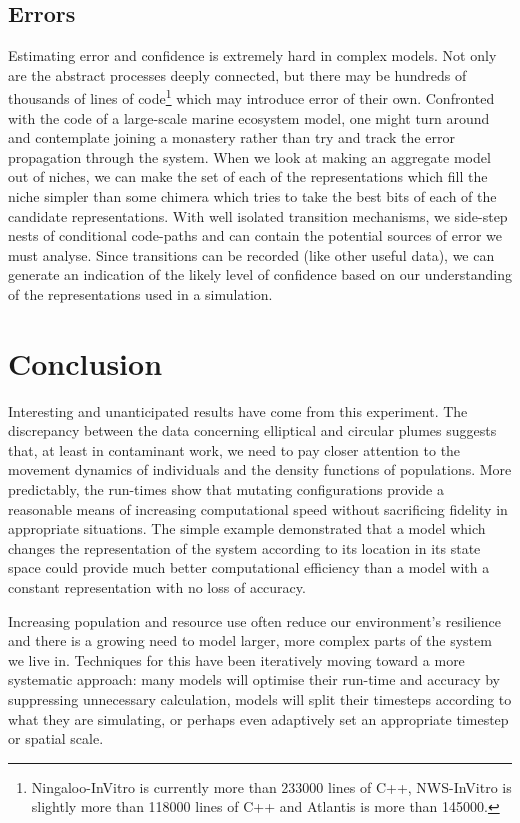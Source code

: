 \subsection{Errors}

Estimating error and confidence is extremely hard in complex models. Not only
are the abstract processes deeply connected, but there may be hundreds of
thousands of lines of code{\footnote{Ningaloo-InVitro is currently more than
233000 lines of C++, NWS-InVitro is slightly more than 118000 lines of C++ and
Atlantis is more than 145000.}} which may introduce error of their own.
Confronted with the code of a large-scale marine ecosystem model, one might
turn around and contemplate joining a monastery rather than try and track the
error propagation through the system. When we look at making an aggregate
model out of niches, we can make the set of each of the representations which
fill the niche simpler than some chimera which tries to take the best bits of
each of the candidate representations. With well isolated transition
mechanisms, we side-step nests of conditional code-paths and can contain the
potential sources of error we must analyse. Since transitions can be recorded
(like other useful data), we can generate an indication of the likely level of
confidence based on our understanding of the representations used in a
simulation.

\section{Conclusion}

Interesting and unanticipated results have come from this experiment. The
discrepancy between the data concerning elliptical and circular plumes
suggests that, at least in contaminant work, we need to pay closer attention
to the movement dynamics of individuals and the density functions of
populations. More predictably, the run-times show that mutating configurations
provide a reasonable means of increasing computational speed without
sacrificing fidelity in appropriate situations. The simple example
demonstrated that a model which changes the representation of the system
according to its location in its state space could provide much better
computational efficiency than a model with a constant representation with no
loss of accuracy.

Increasing population and resource use often reduce our environment's
resilience and there is a growing need to model larger, more complex parts of
the system we live in. Techniques for this have been iteratively moving toward
a more systematic approach: many models will optimise their run-time and
accuracy by suppressing unnecessary calculation, models will split their
timesteps according to what they are simulating, or perhaps even adaptively
set an appropriate timestep or spatial scale.

